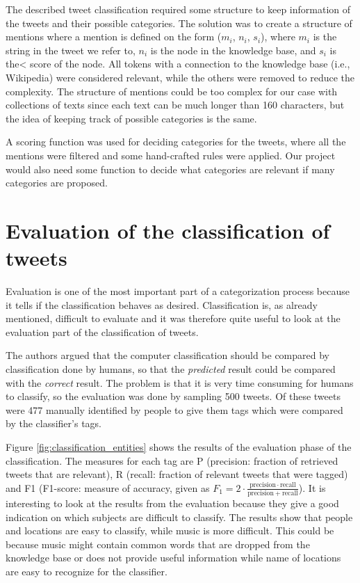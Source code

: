 \documentclass[english,a4paper]{ifimaster}
\begin{document}
The described tweet classification required some structure to keep information of the tweets and their possible categories. The solution was to create a structure of mentions where a mention is defined on the form ($m_{i}$, $n_{i}$, $s_{i}$), where $m_{i}$ is the string in the tweet we refer to, $n_{i}$ is the node in the knowledge base, and  $s_{i}$ is the< score of the node. All tokens with a connection to the knowledge base (i.e., Wikipedia) were considered relevant, while the others were removed to reduce the complexity. The structure of mentions could be too complex for our case with collections of texts since each text can be much longer than 160 characters, but the idea of keeping track of possible categories is the same. 

A scoring function was used for deciding categories for the tweets, where all the mentions were filtered and some hand-crafted rules were applied. Our project would also need some function to decide what categories are relevant if many categories are proposed. 

\chapter{Evaluation of the classification of tweets}
Evaluation is one of the most important part of a categorization process because it tells if the classification behaves as desired. Classification is, as already mentioned, difficult to evaluate and it was therefore quite useful to look at the evaluation part of the classification of tweets.

The authors argued that the computer classification should be compared by classification done by humans, so that the \textit{predicted} result could be compared with the \textit{correct} result. The problem is that it is very time consuming for humans to classify, so the evaluation was done by sampling 500 tweets. Of these tweets were 477 manually identified by people to give them tags which were compared by the classifier's tags. 

Figure \ref{fig:classification_entities} shows the results of the evaluation phase of the classification. The measures for each tag are P (precision: fraction of retrieved tweets that are relevant), R (recall: fraction of relevant tweets that were tagged) and F1 (F1-score: measure of accuracy, given as $ F_1 = 2 \cdot \frac{\mathrm{precision} \cdot \mathrm{recall}}{\mathrm{precision} + \mathrm{recall}}$). It is interesting to look at the results from the evaluation because they give a good indication on which subjects are difficult to classify. The results show that people and locations are easy to classify, while music is more difficult. This could be because music might contain common words that are dropped from the knowledge base or does not provide useful information while name of locations are easy to recognize for the classifier. 
\end{document}
